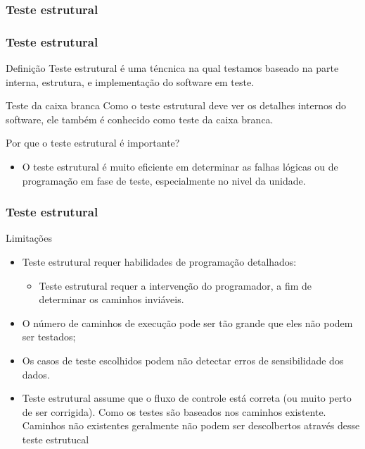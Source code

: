 \begin{frame}[parent={cmap:software-testing}, hasprev=false, hasnext=true]
\frametitle{Teste estrutural}
\label{cmap:structural-software-testing}
\label{cmap:structural-testing}

\end{frame}



\begin{frame}[parent={cmap:structural-software-testing},hasnext=true,hasprev=true]
\frametitle{Teste estrutural}
\label{concept:structural-testing}

\begin{block:concept}{Definição}
Teste estrutural é uma téncnica na qual testamos baseado na parte interna, estrutura, e implementação do software em teste.
\end{block:concept}

\begin{block:fact}{Teste da caixa branca}
Como o teste estrutural deve ver os detalhes internos do software, ele também é conhecido como teste da caixa branca.
\end{block:fact}

\begin{block:fact}{Por que o teste estrutural é importante?}
\begin{itemize}
	\item O teste estrutural é muito eficiente em determinar as falhas lógicas ou de programação em fase de teste, especialmente no nivel da unidade.
\end{itemize}
\end{block:fact}
\end{frame}


\begin{frame}
\frametitle{Teste estrutural}

\begin{block:concept}{Limitações}
\begin{itemize}
	\item Teste estrutural requer habilidades de programação detalhados:
	\begin{itemize}
		\item Teste estrutural requer a intervenção do programador, a fim de determinar os caminhos inviáveis.
	\end{itemize}

	\item O número de caminhos de execução pode ser tão grande que eles não podem ser testados;

	\item Os casos de teste escolhidos podem não detectar erros de sensibilidade dos dados.
	

	\item Teste estrutural assume que o fluxo de controle está correta (ou muito perto de ser corrigida). Como os testes são baseados nos caminhos existente. Caminhos não existentes geralmente não podem ser descolbertos através desse teste estrutucal
\end{itemize}
\end{block:concept}
\end{frame}



